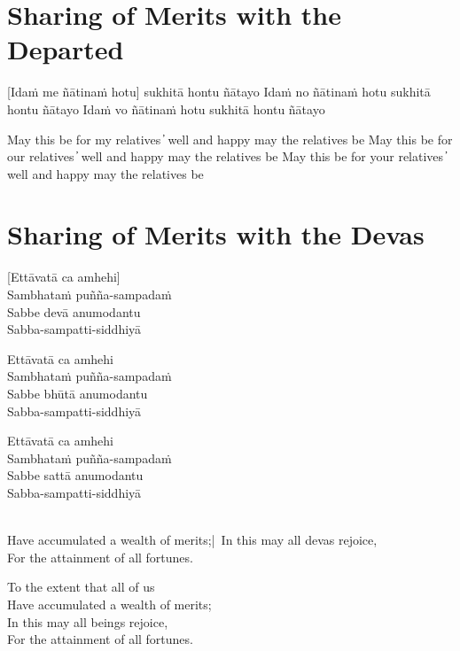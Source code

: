 
\clearpage

\section{Sharing of Merits with the Departed}

[Idaṁ me ñātinaṁ hotu] sukhitā hontu ñātayo
Idaṁ no ñātinaṁ hotu sukhitā hontu ñātayo
Idaṁ vo ñātinaṁ hotu sukhitā hontu ñātayo

\begin{cprenglish}
May this be for my relatives  ̓  well and happy may the relatives be
May this be for our relatives  ̓  well and happy may the relatives be
May this be for your relatives  ̓  well and happy may the relatives be
\end{cprenglish}


\clearpage

\section{Sharing of Merits with the Devas}

[Ettāvatā ca amhehi]\\
Sambhataṁ puñña-sampadaṁ\\
Sabbe devā anumodantu\\
Sabba-sampatti-siddhiyā

Ettāvatā ca amhehi\\
Sambhataṁ puñña-sampadaṁ\\
Sabbe bhūtā anumodantu\\
Sabba-sampatti-siddhiyā

Ettāvatā ca amhehi\\
Sambhataṁ puñña-sampadaṁ\\
Sabbe sattā anumodantu\\
Sabba-sampatti-siddhiyā

\begin{cprenglish}
\\
Have accumulated a wealth of merits;|\
In this may all devas rejoice,\\
For the attainment of all fortunes.
\end{cprenglish}

\begin{cprenglish}
To the extent that all of us\\
Have accumulated a wealth of merits;\\
In this may all beings rejoice,\\
For the attainment of all fortunes.
\end{cprenglish}

